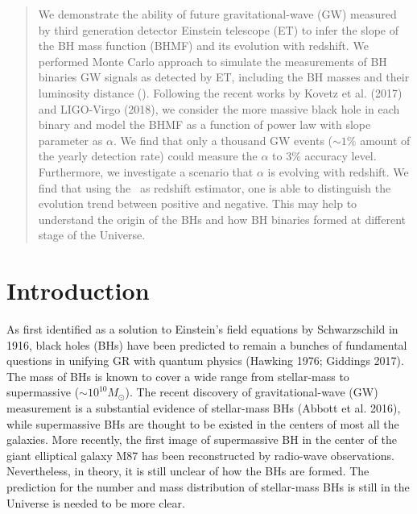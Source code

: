 \documentclass[twocolumn]{aastex62}
\begin{document}
\begin{abstract}
We demonstrate the ability of future gravitational-wave (GW) measured by third generation detector Einstein telescope (ET) to infer the slope of the BH mass function (BHMF) and its evolution with redshift. %
We performed Monte Carlo approach to simulate the measurements of BH binaries GW signals as detected by ET, including the BH masses and their luminosity distance (\dl). Following the recent works by Kovetz et al. (2017) and LIGO-Virgo (2018), we consider the more massive black hole in each binary and model the BHMF as a function of power law with slope parameter as $\alpha$. We find that only a thousand GW events ($\sim1\%$ amount of the yearly detection rate) could measure the $\alpha$ to $3\%$ accuracy level. Furthermore, we investigate a scenario that  $\alpha$ is evolving with redshift. We find that using the \dl\ as redshift estimator, one is able to distinguish the evolution trend between positive and negative. This may help to understand the origin of the BHs and how BH binaries formed at different stage of the Universe.

\end{abstract}


\section{Introduction} \label{sec_intro}
As first identified as a solution to Einstein's field equations by Schwarzschild in 1916, black holes (BHs) have been predicted to remain a bunches of fundamental questions in unifying GR with quantum physics (Hawking 1976; Giddings 2017). The mass of BHs is known to cover a wide range from stellar-mass to supermassive ($\sim10^{10} M_{\odot}$). The recent discovery of gravitational-wave (GW) measurement is a substantial evidence of stellar-mass BHs (Abbott et al. 2016), while supermassive BHs are thought to be existed in the centers of most all the galaxies. More recently, the first image of supermassive BH in the center of the giant elliptical galaxy M87 has been reconstructed by radio-wave observations. Nevertheless, in theory, it is still unclear of how the BHs are formed. The prediction for the number and mass distribution of stellar-mass BHs is still in the Universe is needed to be more clear.
\end{document}
